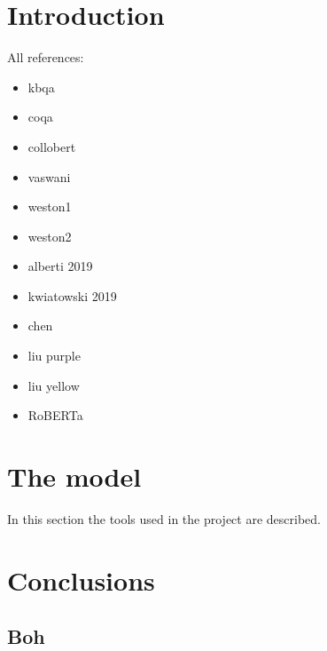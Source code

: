 \documentclass[12pt,a4paper,hidelinks]{article}
\begin{document}

\tableofcontents
\thispagestyle{empty}
\newpage
\setcounter{page}{1}


\section{Introduction}\label{sec:intro}

All references:
\begin{itemize}
  \item kbqa~\cite{kbqa}    
  \item coqa~\cite{coqa}
  \item collobert~\cite{Collobert}
  \item vaswani~\cite{vaswani}
  \item weston1~\cite{weston-tracking}
  \item weston2~\cite{weston-reading}
  \item alberti 2019~\cite{alberti}
  \item kwiatowski 2019~\cite{kwiatowski}
  \item chen~\cite{chen}
  \item liu purple~\cite{liu-purple}
  \item liu yellow~\cite{liu-yellow}
  \item RoBERTa~\cite{roberta}
\end{itemize}

\section{The model}\label{sec:model}
In this section the tools used in the project are described.

\section{Conclusions}\label{sec:conclusions}

\subsection{Boh}



\end{document}
